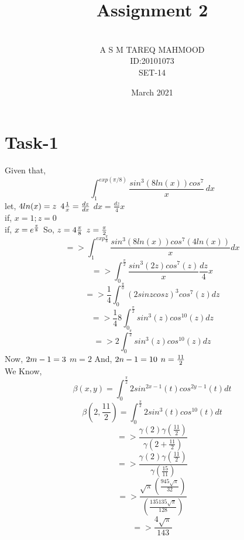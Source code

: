 \documentclass{article}
\begin{document}
\title{Assignment 2}
\author{\\A S M TAREQ MAHMOOD\\ID:20101073\\SET-14\\}
\date{March 2021}
\maketitle
\pagebreak


\section{Task-1}
Given that,
\[ \int_{1}^{exp(\pi/8)} \frac{sin^3(8ln(x))cos^7}{x} \,dx \]
let,
$4ln(x)=z\\$
$4 \frac{1}{x}= \frac{dz}{dx}\\$
$ dx = \frac{dz}{4}x$
\\if,
$x =1 ; z=0$
\\if,
$ x = e^{\frac{\pi}{8}}\\$
So,
$\\z =4 \frac{\pi}{8}$
$\\z = \frac{\pi}{2}$
\[=>\int_{1}^{exp{\frac{\pi}{8}}} \frac{sin^3 (8ln(x)) cos^7(4ln(x))}{x} dx \]
\[=>\int_{0}^{\frac{\pi}{2}} \frac{sin^3(2z) cos^7(z)}{x} \frac{dz}{4} x \]
\[=> \frac{1}{4}  \int_{0}^{\frac{\pi}{0}} (2sinzcosz)^3 cos^7(z) dz\]
\[=> \frac{1}{4} 8 \int_{0}^{\frac{\pi}{2}} sin^3(z)cos^{10}(z) dz\]
\[=> 2 \int_{0}^{\frac{\pi}{2}} sin^3(z)cos^{10}(z) dz\]
Now,
$2m-1=3\\$
$m=2$
And,
$\\2n-1=10$	
$\\n=\frac{11}{2}$
\\We Know,
\[\beta (x,y) = \int_{0}^{\frac{\pi}{2}} 2sin^{2x-1}(t)cos^{2y-1}(t) dt\]
\[\beta (2,\frac{11}{2}) = \int_{0}^{\frac{\pi}{2}} 2sin^{3}(t)cos^{10}(t) dt\]
\[=> \frac{\gamma (2) \gamma(\frac{11}{2})}{\gamma (2+ \frac{11}{2})}          \]
\[=> \frac{\gamma (2) \gamma(\frac{11}{2})}{\gamma (\frac{15}{11})}          \]
\[=> \frac{\sqrt{\pi} (\frac{945 \sqrt{\pi}}{32})} {(\frac{135135 \sqrt{\pi}}{128})} \]
\[=> \frac{4 \sqrt{\pi}}{143}\]
\newpage
\end{document}
